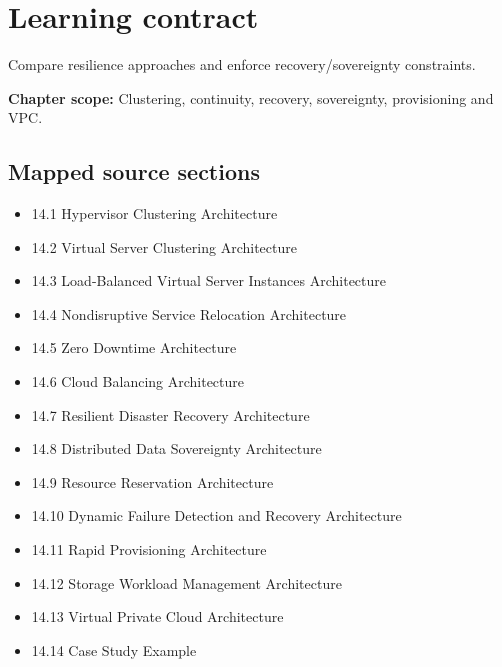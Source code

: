 \documentclass[10pt,letterpaper]{article}
\begin{document}
\sourceStatement
\tableofcontents
\newpage
\section{Learning contract}
\begin{takeaway}
Compare resilience approaches and enforce recovery/sovereignty constraints.
\end{takeaway}
\textbf{Chapter scope:} Clustering, continuity, recovery, sovereignty, provisioning and VPC.\\
\subsection{Mapped source sections}
\begin{itemize}
\item 14.1 Hypervisor Clustering Architecture
\item 14.2 Virtual Server Clustering Architecture
\item 14.3 Load-Balanced Virtual Server Instances Architecture
\item 14.4 Nondisruptive Service Relocation Architecture
\item 14.5 Zero Downtime Architecture
\item 14.6 Cloud Balancing Architecture
\item 14.7 Resilient Disaster Recovery Architecture
\item 14.8 Distributed Data Sovereignty Architecture
\item 14.9 Resource Reservation Architecture
\item 14.10 Dynamic Failure Detection and Recovery Architecture
\item 14.11 Rapid Provisioning Architecture
\item 14.12 Storage Workload Management Architecture
\item 14.13 Virtual Private Cloud Architecture
\item 14.14 Case Study Example
\end{itemize}
\end{document}
